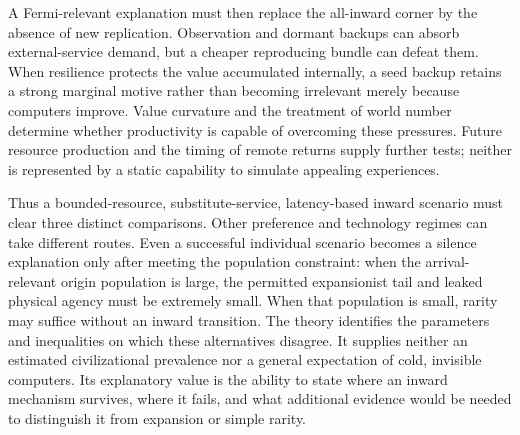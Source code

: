 A Fermi-relevant explanation must then replace the all-inward corner by
the absence of new replication. Observation and dormant backups can absorb
external-service demand, but a cheaper reproducing bundle can defeat them.
When resilience protects the value accumulated internally, a seed backup
retains a strong marginal motive rather than becoming irrelevant merely
because computers improve. Value curvature and the treatment of world
number determine whether productivity is capable of overcoming these
pressures. Future resource production and the timing of remote returns
supply further tests; neither is represented by a static capability to
simulate appealing experiences.

Thus a bounded-resource, substitute-service, latency-based inward scenario
must clear three distinct comparisons. Other preference and technology
regimes can take different routes. Even a successful individual scenario
becomes a silence explanation only after meeting the population constraint:
when the arrival-relevant origin population is large, the permitted
expansionist tail and leaked physical agency must be extremely small.
When that population is small, rarity may suffice without an inward
transition. The theory identifies the parameters and inequalities on
which these alternatives disagree. It supplies neither an estimated
civilizational prevalence nor a general expectation of cold, invisible
computers. Its explanatory value is the ability to state where an inward
mechanism survives, where it fails, and what additional evidence would be
needed to distinguish it from expansion or simple rarity.

